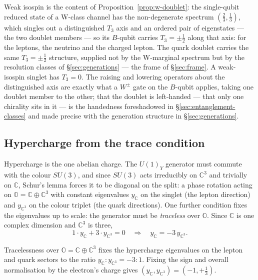 Weak isospin is the content of Proposition~\ref{prop:w-doublet}: the single-qubit reduced state of
a W-class channel has the non-degenerate spectrum $(\tfrac23,\tfrac13)$, which singles out a
distinguished $T_3$ axis and an ordered pair of eigenstates --- the two doublet members --- so its
$B$-qubit carries $T_3 = \pm\tfrac12$ along that axis: for the leptons, the neutrino and the
charged lepton. The quark doublet carries the same $T_3 = \pm\tfrac12$ structure, supplied not by
the W-marginal spectrum but by the resolution classes of \S\ref{sec:generations} --- the frame of \S\ref{sec:frame}. A
weak-isospin
singlet has $T_3 = 0$. The raising and lowering operators
about the distinguished axis are exactly what a $W^\pm$ gate on the $B$-qubit applies, taking one
doublet member to the other; that the doublet is left-handed --- that only one chirality sits in it
--- is the handedness foreshadowed in \S\ref{sec:entanglement-classes} and made precise with the
generation structure in \S\ref{sec:generations}.

\subsection{Hypercharge from the trace condition}

Hypercharge is the one abelian charge. The $U(1)_Y$ generator must commute with the colour $SU(3)$,
and since $SU(3)$ acts irreducibly on $\mathbb{C}^3$ and trivially on $\mathbb{C}$, Schur's lemma
forces it to be diagonal on the split: a phase rotation acting on
$\mathbb{O} = \mathbb{C}\oplus\mathbb{C}^3$ with constant eigenvalues $y_{\mathbb{C}}$ on the
singlet (the lepton direction) and $y_{\mathbb{C}^3}$ on the colour triplet (the quark directions).
One further condition fixes the eigenvalues up to scale: the generator must be \emph{traceless}
over $\mathbb{O}$. Since $\mathbb{C}$ is one complex dimension and $\mathbb{C}^3$ is three,
\begin{equation}
  1\cdot y_{\mathbb{C}} + 3\cdot y_{\mathbb{C}^3} = 0
  \quad\Longrightarrow\quad
  y_{\mathbb{C}} = -3\,y_{\mathbb{C}^3}.
  \label{eq:trace}
\end{equation}

\begin{proposition}\label{prop:hypercharge}
Tracelessness over $\mathbb{O} = \mathbb{C}\oplus\mathbb{C}^3$ fixes the hypercharge eigenvalues on
the lepton and quark sectors to the ratio $y_{\mathbb{C}} : y_{\mathbb{C}^3} = -3 : 1$. Fixing the
sign and overall normalisation by the electron's charge gives $(y_{\mathbb{C}}, y_{\mathbb{C}^3}) =
(-1, +\tfrac13)$.
\end{proposition}

